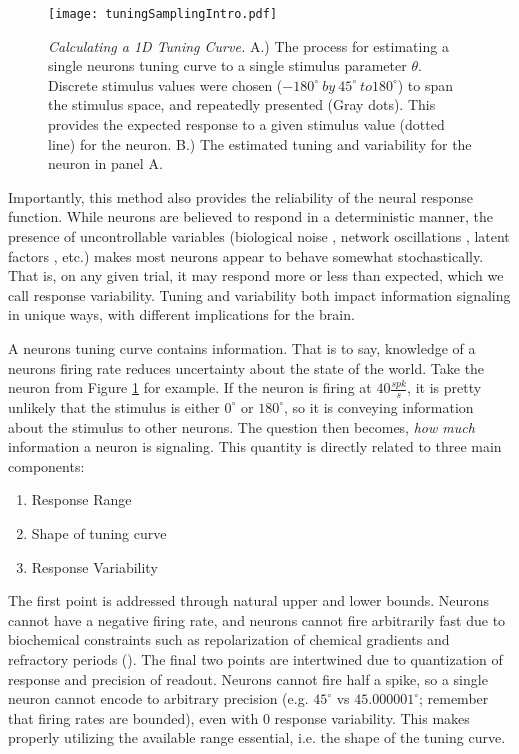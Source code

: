 \begin{figure}[h]
	\centerline{\texttt{[image: tuningSamplingIntro.pdf]}}
	\caption{\textit{Calculating a 1D Tuning Curve.} A.) The process for estimating a single neurons tuning curve to a single stimulus parameter $\theta$. Discrete stimulus values were chosen ($-180^\circ\ by\ 45^\circ\ to 180^\circ$) to span the stimulus space, and repeatedly presented (Gray dots). This provides the expected response to a given stimulus value (dotted line) for the neuron. B.) The estimated tuning and variability for the neuron in panel A.}
	\label{fig:tuningIntro}
\end{figure}

Importantly, this method also provides the reliability of the neural response function. While neurons are believed to respond in a deterministic manner, the presence of uncontrollable variables (biological noise \parencite{Faisal2008}, network oscillations \parencite{Fries2005}, latent factors \parencite{Yu2009, Chen2006}, etc.) makes most neurons appear to behave somewhat stochastically. That is, on any given trial, it may respond more or less than expected, which we call response variability. Tuning and variability both impact information signaling in unique ways, with different implications for the brain. 

A neurons tuning curve contains information. That is to say, knowledge of a neurons firing rate reduces uncertainty about the state of the world. Take the neuron from Figure \ref{fig:tuningIntro} for example. If the neuron is firing at $40\frac{spk}{s}$, it is pretty unlikely that the stimulus is either $0^\circ$ or $180^\circ$, so it is conveying information about the stimulus to other neurons. The question then becomes, \textit{how much} information a neuron is signaling. This quantity is directly related to three main components:

\begin{enumerate}
	\item Response Range
	\item Shape of tuning curve
	\item Response Variability
\end{enumerate}

The first point is addressed through natural upper and lower bounds. Neurons cannot have a negative firing rate, and neurons cannot fire arbitrarily fast due to biochemical constraints such as repolarization of chemical gradients and refractory periods (\cite{Kole2012}). The final two points are intertwined due to quantization of response and precision of readout. Neurons cannot fire half a spike, so a single neuron cannot encode to arbitrary precision (e.g. $45^\circ$ vs $45.000001^\circ$; remember that firing rates are bounded), even with 0 response variability. This makes properly utilizing the available range essential, i.e. the shape of the tuning curve.

